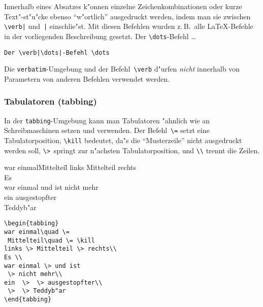 Innerhalb eines Absatzes k"onnen einzelne Zeichenkombinationen
oder kurze Text"-st"u"cke ebenso "`w"ortlich"' ausgedruckt
werden, indem man sie zwischen \verb.\verb|. und~\verb.|.
einschlie"st.
Mit diesen Befehlen wurden z.\,B.\ alle \LaTeX-Befehle in der
vorliegenden Beschreibung gesetzt.
\exa
Der \verb|\dots|-Befehl \dots
\exb
\begin{verbatim}
Der \verb|\dots|-Befehl \dots
\end{verbatim}
\exc
 
Die \texttt{verbatim}-Umgebung und der Befehl~\verb|\verb|
d"urfen \emph{nicht} innerhalb von Parametern von anderen Befehlen
verwendet werden.


 
\subsubsection{Tabulatoren (tabbing)} \label{tabbing}
 
In der \texttt{tabbing}-Umgebung kann man Tabulatoren "ahnlich wie
an Schreibmaschinen setzen und verwenden.
Der Befehl~\verb|\=| setzt eine Tabulatorposition,
\verb|\kill| bedeutet, da"s die "`Musterzeile"' nicht ausgedruckt werden
soll,
\verb|\>|~springt zur n"achsten Tabulatorposition,
und \verb|\\| trennt die Zeilen.
%
\par\vspace{0pt plus5\baselineskip}
\pagebreak[3]\vspace{0pt plus-5\baselineskip}
%
\exa
\begin{tabbing}
war einmal\quad \=
 Mittelteil\quad \= \kill
links \> Mittelteil \> rechts\\
Es \\
war einmal \> und ist
 \> nicht mehr\\
ein  \>  \> ausgestopfter\\
 \>  \> Teddyb"ar
\end{tabbing}
\exb
\begin{verbatim}
\begin{tabbing}
war einmal\quad \=
 Mittelteil\quad \= \kill
links \> Mittelteil \> rechts\\
Es \\
war einmal \> und ist
 \> nicht mehr\\
ein  \>  \> ausgestopfter\\
 \>  \> Teddyb"ar
\end{tabbing}
\end{verbatim}
\exc


